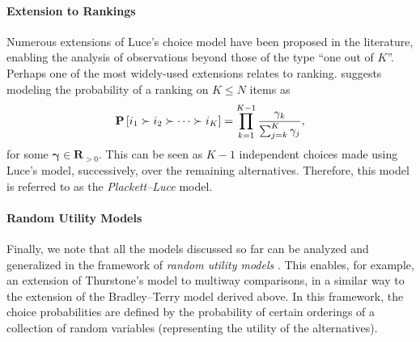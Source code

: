 \paragraph{Extension to Rankings}
Numerous extensions of Luce's choice model have been proposed in the literature, enabling the analysis of observations beyond those of the type ``one out of $K$''.
Perhaps one of the most widely-used extensions relates to ranking.
\citet{plackett1975analysis} suggests modeling the probability of a ranking on $K \le N$ items as
\begin{align*}
\mathbf{P}\left[ i_1 \succ i_2 \succ \cdots \succ i_K \right] = \prod_{k = 1}^{K - 1} \frac{\gamma_k}{\sum_{j = k}^K \gamma_j},
\end{align*}
for some $\bm{\gamma} \in \mathbf{R}_{>0}$.
This can be seen as $K-1$ independent choices made using Luce's model, successively, over the remaining alternatives.
Therefore, this model is referred to as the \emph{Plackett--Luce} model.

\paragraph{Random Utility Models}
Finally, we note that all the models discussed so far can be analyzed and generalized in the framework of \emph{random utility models} \citep{train2009discrete}.
This enables, for example, an extension of Thurstone's model to multiway comparisons, in a similar way to the extension of the Bradley--Terry model derived above.
In this framework, the choice probabilities are defined by the probability of certain orderings of a collection of random variables (representing the utility of the alternatives).


